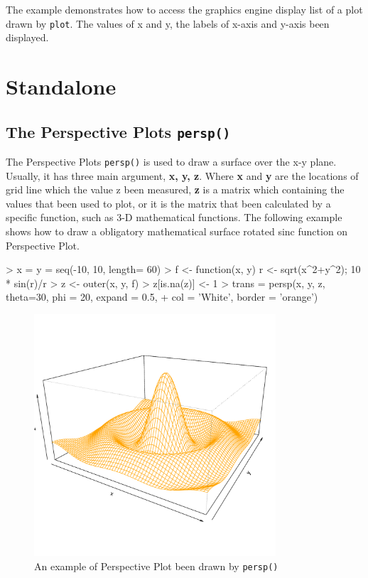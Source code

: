 \documentclass[paper=a4, fontsize=11pt]{report}
\begin{document}
The example demonstrates how to access the graphics engine display list of a plot drawn by \texttt{plot}. The values of x and y, the labels of x-axis and y-axis been displayed.



\chapter{Standalone}
\section{The Perspective Plots \texttt{persp()}}
The Perspective Plots \texttt{persp()} is used to draw a surface over the x-y plane. Usually, it has three main argument, \textbf{x, y, z}. Where \textbf{x} and \textbf{y} are the locations of grid line which the value z been measured, \textbf{z} is a matrix which containing the values that been used to plot, or it is the matrix that been calculated by a specific function, such as 3-D mathematical functions. The following example shows how to draw a obligatory mathematical surface rotated sinc function on Perspective Plot.
\begin{Schunk}
\begin{Sinput}
> x = y = seq(-10, 10, length= 60)
> f <- function(x, y) { r <- sqrt(x^2+y^2); 10 * sin(r)/r }
> z <- outer(x, y, f)
> z[is.na(z)] <- 1
> trans = persp(x, y, z, theta=30, phi = 20, expand = 0.5,
+               col = 'White', border = 'orange')
\end{Sinput}
\end{Schunk}
\begin{figure}[h]
\begin{center}
  \includegraphics[height = 9cm, width = 9cm]{figure/standalone_1.pdf}
  \caption{An example of Perspective Plot been drawn by \texttt{persp()}}
  	\label{figure4}
\end{center}
\end{figure}
\end{document}
